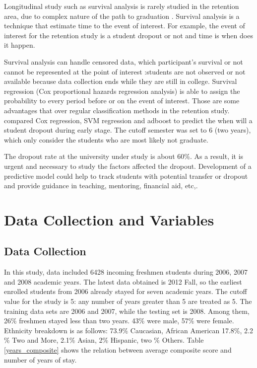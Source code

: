 \documentclass[12pt,english]{report}
\begin{document}
Longitudinal study such as survival analysis is rarely studied in the retention
area, due to complex nature of the path to graduation \citep{Murtaugh1999,
Ishitani2003, zwick2005}. Survival analysis is a technique that estimate time
to the event of interest. For example, the event of interest for the retention
study is a student dropout or not and time is when does it happen.


Survival analysis can handle censored data, which participant's survival or not
cannot be represented at the point of interest :students are not observed or
not available because data collection ends while they are still in college.
Survival regression (Cox proportional hazards regression analysis) is able to
assign the probability to every period before or on the event of interest.
Those are some advantages that over regular classification methods in the
retention study. \citet{Ameri2016} compared Cox regression, SVM regression and
adboost to predict the when will a student dropout during early stage. The
cutoff semester was set to 6 (two years), which only consider the students who
are most likely not graduate.

The dropout rate at the university under study is about 60\%. As a result, it
is urgent and necessary to study the factors affected the dropout.  Development
of a predictive model could help to track students with potential transfer or
dropout and provide guidance in teaching, mentoring, financial aid, etc,.  



\section{Data Collection and Variables}

\subsection{Data Collection}

In this study, data included 6428 incoming freshmen students during 2006, 2007
and 2008 academic years. The latest data obtained is 2012 Fall, so the earliest
enrolled students from 2006 already stayed for seven academic years. The cutoff
value for the study is 5: any number of years greater than 5 are treated as 5.
The training data sets are 2006 and 2007, while the testing set is 2008.
Among them, 26\% freshmen stayed less than two years. 43\% were male, 57\% were
female. Ethnicity breakdown is as follows: 73.9\% Caucasian, African American
17.8\%, 2.2 \% Two and More, 2.1\% Asian, 2\% Hispanic, two \% Others. Table 
\ref{years_composite} shows the relation between average composite score and
number of years of stay.
\end{document}
